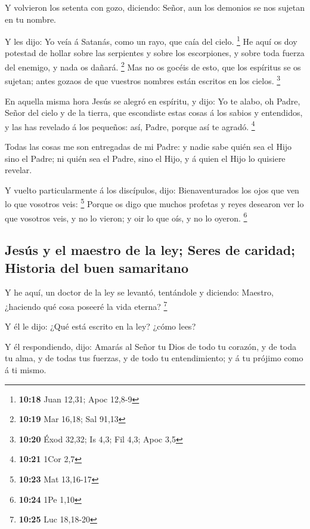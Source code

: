  Y volvieron los setenta con gozo, diciendo: Señor, aun los
demonios se nos sujetan en tu nombre.

 Y les dijo: Yo veía á Satanás, como un rayo, que caía del
cielo. \footnote{\textbf{10:18} Juan 12,31; Apoc 12,8-9} 
He aquí os doy potestad de hollar sobre las serpientes y sobre los
escorpiones, y sobre toda fuerza del enemigo, y nada os dañará.
\footnote{\textbf{10:19} Mar 16,18; Sal 91,13}  Mas no os
gocéis de esto, que los espíritus se os sujetan; antes gozaos de que
vuestros nombres están escritos en los cielos. \footnote{\textbf{10:20}
  Éxod 32,32; Is 4,3; Fil 4,3; Apoc 3,5}

 En aquella misma hora Jesús se alegró en espíritu, y dijo:
Yo te alabo, oh Padre, Señor del cielo y de la tierra, que escondiste
estas cosas á los sabios y entendidos, y las has revelado á los
pequeños: así, Padre, porque así te agradó. \footnote{\textbf{10:21}
  1Cor 2,7}

 Todas las cosas me son entregadas de mi Padre: y nadie
sabe quién sea el Hijo sino el Padre; ni quién sea el Padre, sino el
Hijo, y á quien el Hijo lo quisiere revelar.

 Y vuelto particularmente á los discípulos, dijo:
Bienaventurados los ojos que ven lo que vosotros veis: \footnote{\textbf{10:23}
  Mat 13,16-17}  Porque os digo que muchos profetas y reyes
desearon ver lo que vosotros veis, y no lo vieron; y oir lo que oís, y
no lo oyeron. \footnote{\textbf{10:24} 1Pe 1,10}

\hypertarget{jesuxfas-y-el-maestro-de-la-ley-seres-de-caridad-historia-del-buen-samaritano}{%
\subsection{Jesús y el maestro de la ley; Seres de caridad; Historia del
buen
samaritano}\label{jesuxfas-y-el-maestro-de-la-ley-seres-de-caridad-historia-del-buen-samaritano}}

 Y he aquí, un doctor de la ley se levantó, tentándole y
diciendo: Maestro, ¿haciendo qué cosa poseeré la vida eterna?
\footnote{\textbf{10:25} Luc 18,18-20}

 Y él le dijo: ¿Qué está escrito en la ley? ¿cómo lees?

 Y él respondiendo, dijo: Amarás al Señor tu Dios de todo
tu corazón, y de toda tu alma, y de todas tus fuerzas, y de todo tu
entendimiento; y á tu prójimo como á ti mismo.

